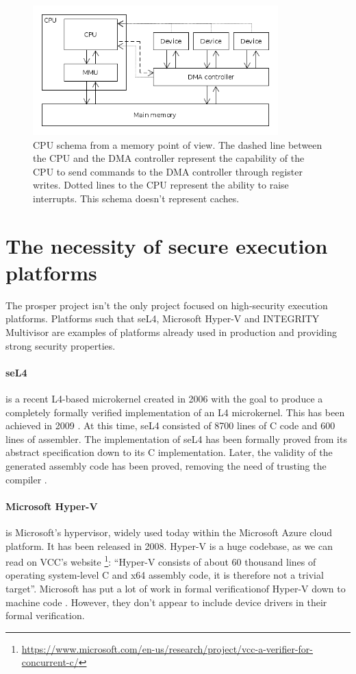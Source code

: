 \documentclass{kththesis}
\begin{document}
\begin{figure}[!t]
	\includegraphics[height=5cm]{figures/cpu-memory-schema.png}
	\centering
	\caption{CPU schema from a memory point of view. The dashed line between the CPU and the DMA controller represent the capability of the CPU to send commands to the DMA controller through register writes. Dotted lines to the CPU represent the ability to raise interrupts. This schema doesn't represent caches.}
	\label{cpu-memory-schema}
\end{figure}

\section{The necessity of secure execution platforms}

The \acrshort{prosper} project isn't the only project focused on high-security execution platforms. Platforms such that seL4, Microsoft Hyper-V and INTEGRITY Multivisor are examples of platforms already used in production and providing strong security properties.

\paragraph{seL4} is a recent L4-based microkernel created in 2006 with the goal to produce a completely formally verified implementation of an L4 microkernel. This has been achieved in 2009 \cite{klein_sel4:_2009}. At this time, seL4 consisted of \num{8700} lines of C code and \num{600} lines of assembler. The implementation of seL4 has been formally proved from its abstract specification down to its C implementation. Later, the validity of the generated assembly code has been proved, removing the need of trusting the compiler \cite{noauthor_what_nodate}.

\paragraph{Microsoft Hyper-V} is Microsoft's hypervisor, widely used today within the Microsoft Azure cloud platform. It has been released in 2008. Hyper-V is a huge codebase, as we can read on VCC's website \footnote{\url{https://www.microsoft.com/en-us/research/project/vcc-a-verifier-for-concurrent-c/}}: ``Hyper-V consists of about 60 thousand lines of operating system-level C and x64 assembly code, it is therefore not a trivial target''. Microsoft has put a lot of work in formal verification\footnotemark of Hyper-V down to machine code \cite{leinenbach_verifying_2009}. However, they don't appear to include device drivers in their formal verification.
\end{document}

